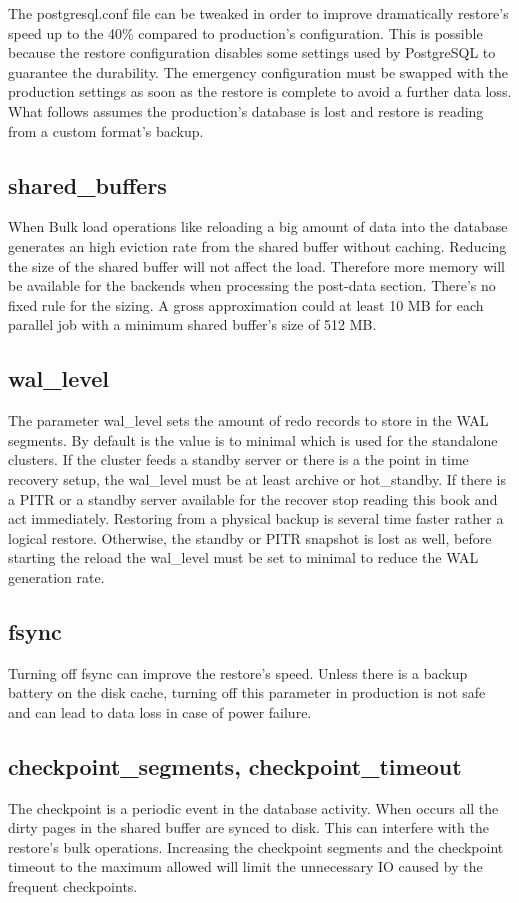 The postgresql.conf file can be tweaked in order to improve dramatically restore's speed up to the 40\%
compared to production's configuration. This is possible because the restore configuration disables some
settings used by PostgreSQL to guarantee the durability. The emergency configuration must be swapped with
the production settings as soon as the restore is complete to avoid a further data loss. What follows
assumes the production's database is lost and restore is reading from a custom format's backup.

\subsection{shared\_buffers}
When Bulk load operations like reloading a big amount of data into the database generates an high eviction
rate from the shared buffer without caching. Reducing the size of the shared buffer will not affect the
load. Therefore more memory will be available for the backends when processing the post-data section.
There's no fixed rule for the sizing. A gross approximation could at least 10 MB for each parallel job
with a minimum shared buffer's size of 512 MB.

\subsection{wal\_level}
The parameter wal\_level sets the amount of redo records to store in the WAL segments.
By default is the value is to minimal which is used for the standalone clusters. If the cluster feeds a
standby server or there is a the point in time recovery setup, the wal\_level must be at least archive
or hot\_standby. If there is a PITR or a standby server available for the recover stop reading this book
and act immediately. Restoring from a physical backup is several time faster rather a logical restore.
Otherwise, the standby or PITR snapshot is lost as well, before starting the reload the wal\_level must be
set to minimal to reduce the WAL generation rate.

\subsection{fsync}
Turning off fsync can improve the restore's speed. Unless there is a backup battery on the disk
cache, turning off this parameter in production is not safe and can lead to data loss in case of power
failure.

\subsection{checkpoint\_segments, checkpoint\_timeout}
The checkpoint is a periodic event in the database activity. When occurs all the dirty pages in the
shared buffer are synced to disk. This can interfere with the restore's bulk operations. Increasing the
checkpoint segments and the checkpoint timeout to the maximum allowed will limit the unnecessary IO caused
by the frequent checkpoints.


